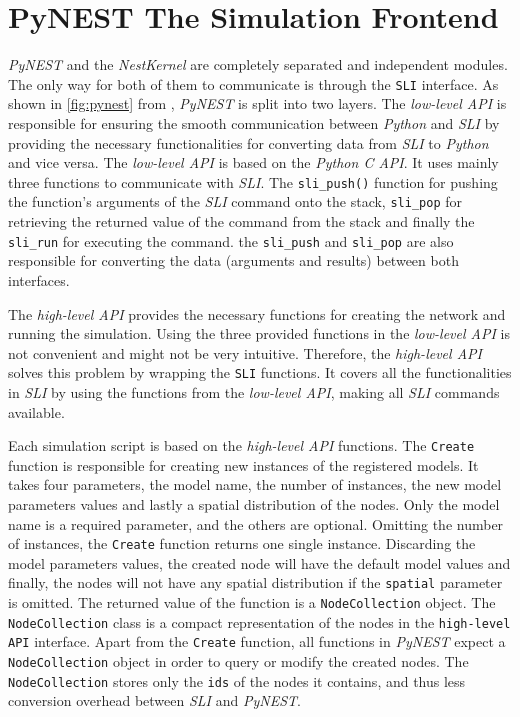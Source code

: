 \section{PyNEST The Simulation Frontend}

\emph{PyNEST} and the \emph{NestKernel} are completely separated and independent modules. The only way for both of them to communicate is through the \texttt{SLI} interface. As shown in \autoref{fig:pynest} from \citep{epp}, \emph{PyNEST} is split into two layers. The \emph{low-level API} is responsible for ensuring the smooth communication between \emph{Python} and \emph{SLI} by providing the necessary functionalities for converting data from \emph{SLI} to \emph{Python} and vice versa. The \emph{low-level API} is based on the \emph{Python C API}. It uses mainly three functions to communicate with \emph{SLI}. The \texttt{sli\_push()} function for pushing the function's arguments of the \emph{SLI} command onto the stack, \texttt{sli\_pop} for retrieving the returned value of the command from the stack and finally the \texttt{sli\_run} for executing the command.  the \texttt{sli\_push} and \texttt{sli\_pop} are also responsible for converting the data (arguments and results) between both interfaces.



 The \emph{high-level API} provides the necessary functions for creating the network and running the simulation. Using the three provided functions in the \emph{low-level API} is not convenient and might not be very intuitive. Therefore, the \emph{high-level API} solves this problem by wrapping the \texttt{SLI} functions. It covers all the functionalities in \emph{SLI} by using the functions from the \emph{low-level API}, making all \emph{SLI} commands available.
 
 Each simulation script is based on the \emph{high-level API} functions. The \texttt{Create} function is responsible for creating new instances of the registered models. It takes four parameters, the model name, the number of instances, the new model parameters values and lastly a spatial distribution of the nodes. Only the model name is a required parameter, and the others are optional. Omitting the number of instances, the \texttt{Create} function returns one single instance. Discarding the model parameters values, the created node will have the default model values and finally, the nodes will not have any spatial distribution if the \texttt{spatial} parameter is omitted. The returned value of the function is a \texttt{NodeCollection} object. The \texttt{NodeCollection} class is a compact representation of the nodes in the \texttt{high-level API} interface. Apart from the \texttt{Create} function, all functions in \emph{PyNEST} expect a \texttt{NodeCollection} object in order to query or modify the created nodes. The \texttt{NodeCollection} stores only the \texttt{ids} of the nodes it contains, and thus less conversion overhead between \emph{SLI} and \emph{PyNEST}. 



